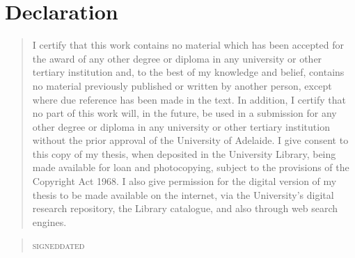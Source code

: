 \documentclass[11pt,a4paper]{memoir}
\begin{document}
\normalsize

\clearpage

\section*{Declaration}

\begin{quote}
\nonfrenchspacing
\parfillskip=0pt
I certify that this work contains no material which has been accepted for the award of any other degree or diploma in any university or other tertiary institution and, to the best of my knowledge and belief, contains no material previously published or written by another person, except where due reference has been made in the text. In addition, I certify that no part of this work will, in the future, be used in a submission for any other degree or diploma in any university or other tertiary institution without the prior approval of the University of Adelaide.
\PPP
I give consent to this copy of my thesis, when deposited in the University Library, being made available for loan and photocopying, subject to the provisions of the Copyright Act 1968.
\PPP
I also give permission for the digital version of my thesis to be made available on the internet, via the University’s digital research repository, the Library catalogue, and also through web search engines.
\end{quote}

\vspace*{1cm}

\begin{quote}
\hrulefill\hrulefill\hrulefill\hfill\hrulefill\hrulefill

\noindent\small\textsc{signed}\hfill\textsc{dated}
\end{quote}
\end{document}
